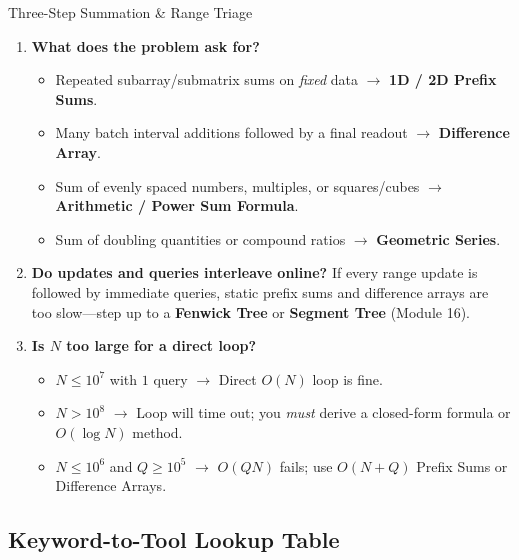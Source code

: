 \documentclass[11pt,a4paper]{article}
\theoremstyle{definition}
\begin{document}
\begin{calloutbox}{Three-Step Summation \& Range Triage}
\begin{enumerate}
    \item \textbf{What does the problem ask for?}
    \begin{itemize}
        \item Repeated subarray/submatrix sums on \emph{fixed} data $\to$ \textbf{1D / 2D Prefix Sums}.
        \item Many batch interval additions followed by a final readout $\to$ \textbf{Difference Array}.
        \item Sum of evenly spaced numbers, multiples, or squares/cubes $\to$ \textbf{Arithmetic / Power Sum Formula}.
        \item Sum of doubling quantities or compound ratios $\to$ \textbf{Geometric Series}.
    \end{itemize}
    \item \textbf{Do updates and queries interleave online?} If every range update is followed by immediate queries, static prefix sums and difference arrays are too slow---step up to a \textbf{Fenwick Tree} or \textbf{Segment Tree} (Module 16).
    \item \textbf{Is $N$ too large for a direct loop?}
    \begin{itemize}
        \item $N \le 10^7$ with $1$ query $\to$ Direct $O(N)$ loop is fine.
        \item $N > 10^8$ $\to$ Loop will time out; you \emph{must} derive a closed-form formula or $O(\log N)$ method.
        \item $N \le 10^6$ and $Q \ge 10^5$ $\to$ $O(QN)$ fails; use $O(N + Q)$ Prefix Sums or Difference Arrays.
    \end{itemize}
\end{enumerate}
\end{calloutbox}

\subsection*{Keyword-to-Tool Lookup Table}
\end{document}
